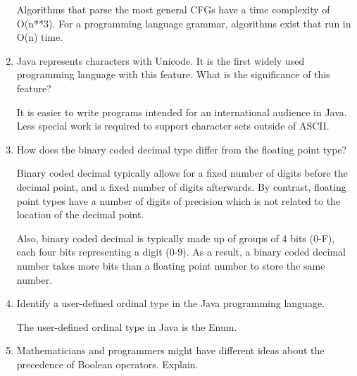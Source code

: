 \begin{enumerate}
\begin{answer}
    Algorithms that parse the most general CFGs have a time complexity of
    O(n**3). For a programming language grammar, algorithms exist that run in
    O(n) time.

    \end{answer}

  \item Java represents characters with Unicode. It is the first
    widely used programming language with this feature. What is the
    significance of this feature?

  \begin{answer}

    It is easier to write programs intended for an international audience in
    Java. Less special work is required to support character sets outside of
    ASCII.

    \end{answer}

  \item How does the binary coded decimal type differ from the
    floating point type?

  \begin{answer}

    Binary coded decimal typically allows for a fixed number of digits before
    the decimal point, and a fixed number of digits afterwards. By contrast,
    floating point types have a number of digits of precision which is not
    related to the location of the decimal point.

    Also, binary coded decimal is typically made up of groups of 4 bits (0-F),
    each four bits representing a digit (0-9). As a result, a binary coded
    decimal number takes more bits than a floating point number to store the
    same number.

    \end{answer}

  \item Identify a user-defined ordinal type in the Java programming
    language.

  \begin{answer}

    The user-defined ordinal type in Java is the Enum.

    \end{answer}

  \item Mathematicians and programmers might have different ideas
    about the precedence of Boolean operators. Explain.

  \begin{answer}


\end{answer}
\end{enumerate}
